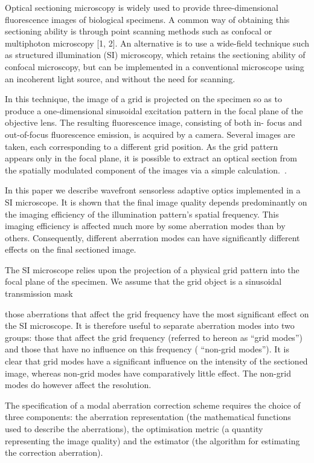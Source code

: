 \cite{wide_AOM_structured_illu}

Optical sectioning microscopy is widely used to provide three-dimensional 
fluorescence images of biological specimens. A common way of obtaining this 
sectioning ability is through point scanning methods such as confocal or 
multiphoton microscopy [1, 2]. An alternative is to use a wide-field 
technique such as structured illumination (SI) microscopy, which retains the 
sectioning ability of confocal microscopy, but can be implemented in a 
conventional microscope using an incoherent light source, and without the 
need for scanning. 

In this technique, the image of a grid is projected on the specimen so as to 
produce a one-dimensional sinusoidal excitation pattern in the focal plane of 
the objective lens. The resulting fluorescence image, consisting of both in-
focus and out-of-focus fluorescence emission, is acquired by a camera. 
Several images are taken, each corresponding to a different grid position. As 
the grid pattern appears only in the focal plane, it is possible to extract 
an optical section from the spatially modulated component of the images via a 
simple calculation.~\cite{wide_structured_illu_principle}.

In this paper we describe wavefront sensorless adaptive optics implemented in 
a SI microscope. It is shown that the final image quality depends 
predominantly on the imaging efficiency of the illumination pattern’s spatial 
frequency. This imaging efficiency is affected much more by some aberration 
modes than by others. Consequently, different aberration modes can have 
significantly different effects on the final sectioned image.

The SI microscope relies upon the projection of a physical grid pattern into 
the focal plane of the specimen. We assume that the grid object is a 
sinusoidal transmission mask

those aberrations that affect the grid frequency have the most significant 
effect on the SI microscope. It is therefore useful to separate aberration 
modes into two groups: those that affect the grid frequency (referred to 
hereon as “grid modes”) and those that have no influence on this frequency (
“non-grid modes”). It is clear that grid modes have a significant influence 
on the intensity of the sectioned image, whereas non-grid modes have 
comparatively little effect. The non-grid modes do however affect the 
resolution.

The specification of a modal aberration correction scheme requires the choice 
of three components: the aberration representation (the mathematical 
functions used to describe the aberrations), the optimisation metric (a 
quantity representing the image quality) and the estimator (the algorithm for 
estimating the correction aberration).

